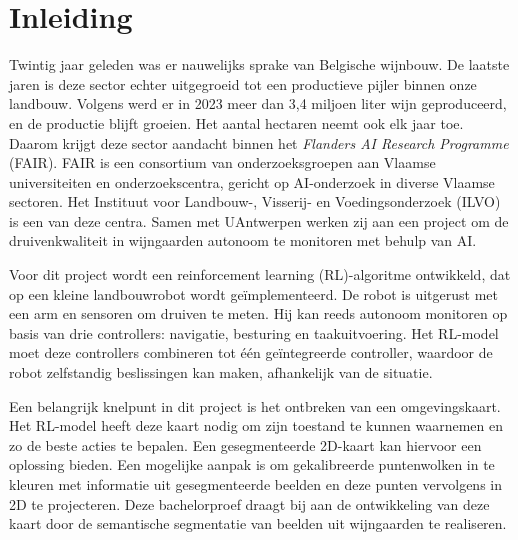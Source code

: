 


% 

\section{Inleiding}%
\label{sec:inleiding}

Twintig jaar geleden was er nauwelijks sprake van Belgische wijnbouw. De laatste jaren is deze sector echter uitgegroeid tot een productieve pijler binnen onze landbouw. Volgens \textcite{FODEconomie2024} werd er in 2023 meer dan 3,4 miljoen liter wijn geproduceerd, en de productie blijft groeien. Het aantal hectaren neemt ook elk jaar toe. Daarom krijgt deze sector aandacht binnen het\textit{ Flanders AI Research Programme} (FAIR). FAIR is een consortium van onderzoeksgroepen aan Vlaamse universiteiten en onderzoekscentra, gericht op AI-onderzoek in diverse Vlaamse sectoren. Het Instituut voor Landbouw-, Visserij- en Voedingsonderzoek (ILVO) is een van deze centra. Samen met UAntwerpen werken zij aan een project om de druivenkwaliteit in wijngaarden autonoom te monitoren met behulp van AI.

Voor dit project wordt een reinforcement learning (RL)-algoritme ontwikkeld, dat op een kleine landbouwrobot wordt geïmplementeerd. De robot is uitgerust met een arm en sensoren om druiven te meten. Hij kan reeds autonoom monitoren op basis van drie controllers: navigatie, besturing en taakuitvoering. Het RL-model moet deze controllers combineren tot één geïntegreerde controller, waardoor de robot zelfstandig beslissingen kan maken, afhankelijk van de situatie.

Een belangrijk knelpunt in dit project is het ontbreken van een omgevingskaart. Het RL-model heeft deze kaart nodig om zijn toestand te kunnen waarnemen en zo de beste acties te bepalen. Een gesegmenteerde 2D-kaart kan hiervoor een oplossing bieden. Een mogelijke aanpak is om gekalibreerde puntenwolken in te kleuren met informatie uit gesegmenteerde beelden en deze punten vervolgens in 2D te projecteren. Deze bachelorproef draagt bij aan de ontwikkeling van deze kaart door de semantische segmentatie van beelden uit wijngaarden te realiseren.

